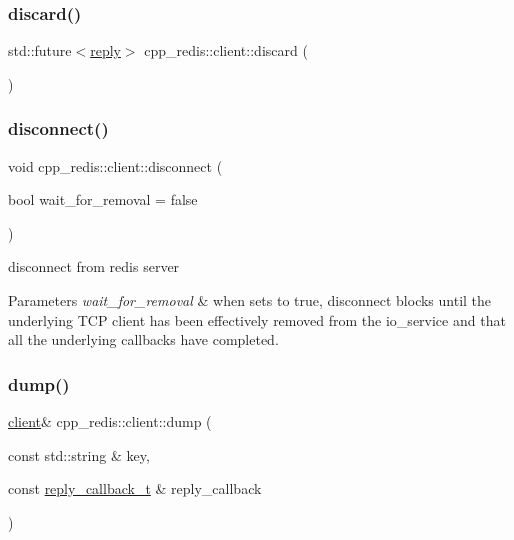 \mbox{\label{classcpp__redis_1_1client_ab37e125f4f94bfa9455dc29f64698e47}} 
\subsubsection{\texorpdfstring{discard()}{discard()}\hspace{0.1cm}{\footnotesize\ttfamily [2/2]}}
{\footnotesize\ttfamily std\+::future$<$\hyperlink{classcpp__redis_1_1reply}{reply}$>$ cpp\+\_\+redis\+::client\+::discard (\begin{DoxyParamCaption}{ }\end{DoxyParamCaption})}

\mbox{\label{classcpp__redis_1_1client_a292252b61bcfdf9ad3854b54b7fe2740}} 
\subsubsection{\texorpdfstring{disconnect()}{disconnect()}}
{\footnotesize\ttfamily void cpp\+\_\+redis\+::client\+::disconnect (\begin{DoxyParamCaption}\item[{bool}]{wait\+\_\+for\+\_\+removal = {\ttfamily false} }\end{DoxyParamCaption})}

disconnect from redis server


\begin{DoxyParams}{Parameters}
{\em wait\+\_\+for\+\_\+removal} & when sets to true, disconnect blocks until the underlying T\+CP client has been effectively removed from the io\+\_\+service and that all the underlying callbacks have completed. \\
\hline
\end{DoxyParams}
\mbox{\label{classcpp__redis_1_1client_aed6bb7657acdd4ea4dd0a4e7ec3eec20}} 
\subsubsection{\texorpdfstring{dump()}{dump()}\hspace{0.1cm}{\footnotesize\ttfamily [1/2]}}
{\footnotesize\ttfamily \hyperlink{classcpp__redis_1_1client}{client}\& cpp\+\_\+redis\+::client\+::dump (\begin{DoxyParamCaption}\item[{const std\+::string \&}]{key,  }\item[{const \hyperlink{classcpp__redis_1_1client_a061a1140d36d2eaeda82b09a0bb3f9f2}{reply\+\_\+callback\+\_\+t} \&}]{reply\+\_\+callback }\end{DoxyParamCaption})}

